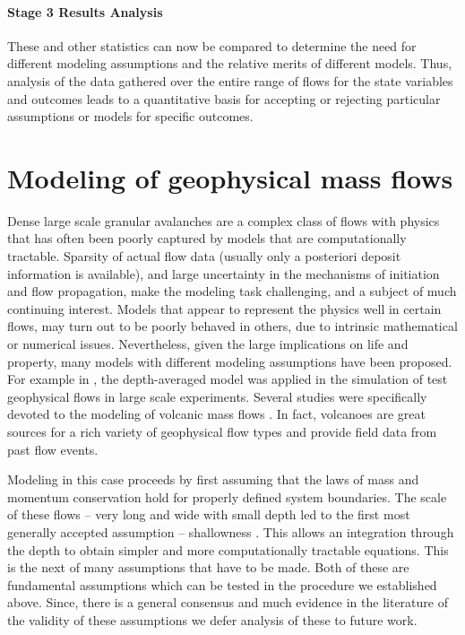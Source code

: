 \documentclass{article}
\begin{document}
\paragraph{Stage 3 Results Analysis} These and other statistics can now be compared to determine the need for different modeling assumptions and the relative merits of different models. Thus, analysis of the data gathered over the entire range of flows for the state variables and outcomes leads to a quantitative basis for accepting or rejecting particular assumptions or models for specific outcomes.

\section{Modeling of geophysical mass flows}\label{subsec:FlowTypes}
Dense large scale granular avalanches are a complex class of flows with physics that has often been poorly captured by models that are computationally tractable. Sparsity of actual flow data (usually only a posteriori deposit information is available), and large uncertainty in the mechanisms of initiation and flow propagation, make the modeling task challenging, and a subject of much continuing interest. Models that appear to represent the physics well in certain flows, may turn out to be poorly behaved in others, due to intrinsic mathematical or numerical issues. Nevertheless, given the large implications on life and property, many models with different modeling assumptions have been proposed. For example in \cite{Iverson1997, Iverson2001, Denlinger2001, Pitman2003a, Denlinger2004, Iverson2004}, the depth-averaged model was applied in the simulation of test geophysical flows in large scale experiments. Several studies were specifically devoted to the modeling of volcanic mass flows \citep{Bursik2005,Kelfoun2005,Charbonnier2009,Kelfoun2009,Procter2010,Kelfoun2011,Charbonnier2013}. In fact, volcanoes are great sources for a rich variety of geophysical flow types and provide field data from past flow events.

Modeling in this case proceeds by first assuming that the laws of mass and momentum conservation hold for properly defined system boundaries. The scale of these flows -- very long and wide with small depth led to the first most generally accepted assumption -- shallowness \cite{SavageHutter1989}. This allows an integration through the depth to obtain simpler and more computationally tractable equations. This is the next of many assumptions that have to be made. Both of these are fundamental assumptions which can be tested in the procedure we established above. Since, there is a general consensus and much evidence in the literature of the validity of these assumptions we defer analysis of these to future work.
\end{document}
